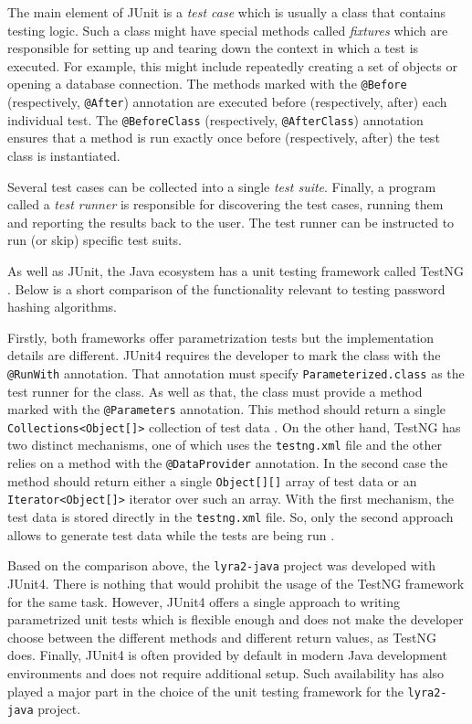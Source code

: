 The main element of JUnit is a \emph{test case} which is usually a class that contains testing logic. Such a class might have special methods called \emph{fixtures} which are responsible for setting up and tearing down the context in which a test is executed. For example, this might include repeatedly creating a set of objects or opening a database connection. The methods marked with the \texttt{@Before} (respectively, \texttt{@After}) annotation are executed before (respectively, after) each individual test. The \texttt{@BeforeClass} (respectively, \texttt{@AfterClass}) annotation ensures that a method is run exactly once before (respectively, after) the test class is instantiated.

Several test cases can be collected into a single \emph{test suite}. Finally, a program called a \emph{test runner} is responsible for discovering the test cases, running them and reporting the results back to the user. The test runner can be instructed to run (or skip) specific test suits.

As well as JUnit, the Java ecosystem has a unit testing framework called TestNG \cite{testng:2017:home}. Below is a short comparison of the functionality relevant to testing password hashing algorithms.

Firstly, both frameworks offer parametrization tests but the implementation details are different. JUnit4 requires the developer to mark the class with the \texttt{@RunWith} annotation. That annotation must specify \texttt{Parameterized.class} as the test runner for the class. As well as that, the class must provide a method marked with the \texttt{@Parameters} annotation. This method should return a single \texttt{Collections<Object[]>} collection of test data \cite{junit:2017:parametrized-testing}. On the other hand, TestNG has two distinct mechanisms, one of which uses the \texttt{testng.xml} file and the other relies on a method with the \texttt{@DataProvider} annotation. In the second case the method should return either a single \texttt{Object[][]} array of test data or an \texttt{Iterator<Object[]>} iterator over such an array. With the first mechanism, the test data is stored directly in the \texttt{testng.xml} file. So, only the second approach allows to generate test data while  the tests are being run \cite{testng:2017:parametrized-testing}.

Based on the comparison above, the \texttt{lyra2-java} project was developed with JUnit4. There is nothing that would prohibit the usage of the TestNG framework for the same task. However, JUnit4 offers a single approach to writing parametrized unit tests which is flexible enough and does not make the developer choose between the different methods and different return values, as TestNG does. Finally, JUnit4 is often provided by default in modern Java development environments and does not require additional setup. Such availability has also played a major part in the choice of the unit testing framework for the \texttt{lyra2-java} project.

